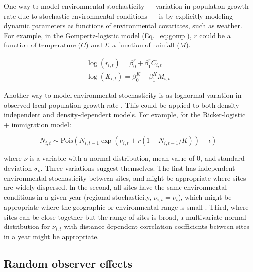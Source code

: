 \documentclass[12pt,english]{article}
\begin{document}
\begin{spacing}{1.9}
\begin{flushleft}
One way to model environmental stochasticity --- variation in population growth
rate due to stochastic environmental conditions --- is by explicitly
modeling dynamic parameters as functions of environmental covariates, such
as weather.  For example, in the Gompertz-logistic model (Eq.~\ref{eq:gomp}), $r$ could be a 
function of temperature ($C$) and $K$ a function of rainfall ($M$):
\begin{linenomath*}
\begin{gather}
\log(r_{i,t}) = \beta^{r}_{0} + \beta^{r}_{1}C_{i,t} \nonumber \\
\log(K_{i,t}) = \beta^{K}_{0} + \beta^{K}_{1}M_{i,t}  
\label{eq:weather}
\end{gather}
\end{linenomath*}

Another way to model environmental stochasticity is as lognormal variation in observed local population 
growth rate \citep{bjornstad:2001,bonsall_hastings:2004}.  This could be applied to both density-independent and density-dependent models.
For example, for the Ricker-logistic + immigration model:
\begin{linenomath*}
\begin{equation}
N_{i,t} \sim
\mathrm{Pois}(N_{i,t-1}\exp(\nu_{i,t} + r(1-N_{i,t-1}/K)) + \iota)
\label{eq:nuRand}
\end{equation}
\end{linenomath*}
where $\nu$ is a variable with a normal distribution, mean value of 0, and standard deviation $\sigma_\nu$.  
Three variations suggest themselves.  The first has independent environmental stochasticity 
between sites, and might be appropriate where sites are widely dispersed.  In the second, 
all sites have the same environmental conditions in a given year (regional stochasticity, $\nu_{i,t} = \nu_{t}$),
which might be appropriate where the geographic or environmental range is small \citep{hanski:1998}.  
Third, where sites can be close together but the range of sites is broad, a multivariate normal distribution 
for $\nu_{i,t}$ with distance-dependent correlation coefficients %
between sites in a year might be appropriate.

\subsection*{Random observer effects}


\end{flushleft}
\end{spacing}
\end{document}
